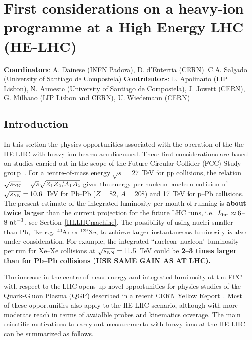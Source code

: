 \documentclass[../report.tex]{subfiles}
\begin{document}
\section{First considerations on a heavy-ion programme at a High Energy LHC (HE-LHC)}
\label{sec:HELHC}

\textbf{Coordinators}: A. Dainese (INFN Padova), D. d'Enterria (CERN), C.A. Salgado (University of Santiago de Compostela)
\linebreak
\textbf{Contributors}: L. Apolinario (LIP Lisbon), N. Armesto (University of Santiago de Compostela), J. Jowett (CERN), G. Milhano (LIP Lisbon and CERN), U. Wiedemann (CERN)

\subsection{Introduction}
\label{sec:HELHC_intro}

In this section the physics opportunities associated with the operation of the the HE-LHC with heavy-ion beams are discussed.
These first considerations are based on studies carried out in the scope of the Future Circular Collider (FCC) Study group~\cite{Dainese:2016gch,FCC-CDR}.
For a centre-of-mass energy $\sqrt{s}= 27$~TeV for pp collisions, the relation $\sqrt{s_{\rm NN}}= \sqrt {s} \sqrt{Z_1 Z_2 / A_1 A_2}$ 
gives the energy per nucleon--nucleon collision of $\sqrt{s_{\rm NN}} = 10.6$~TeV for Pb--Pb ($Z=82$, $A=208$) and 17~TeV for p--Pb collisions. 
The present estimate of the integrated luminosity per month of running is {\bf about twice larger} than  the current projection for the future 
LHC runs, i.e.\, $L_{\rm int}\approx 6$--$8~{\rm nb}^{-1}$, see Section~\ref{HLLHCmachine}. 
The possibility of using nuclei smaller than Pb, like e.g. $^{40}$Ar or $^{129}$Xe, to achieve larger instantaneous luminosity is also under consideration. 
For example, the integrated ``nucleon--nucleon'' luminosity per run 
for Xe--Xe collisions at $\sqrt{s_{\rm NN}}= 11.5$~TeV could be {\bf 2--3 times larger than for Pb--Pb collisions (USE SAME GAIN AS AT LHC).}

The increase in the centre-of-mass energy and integrated luminosity at the FCC with respect to the LHC opens up novel opportunities for physics studies of the Quark-Gluon Plasma (QGP) described in a recent CERN Yellow Report~\cite{Dainese:2016gch}. Most of these opportunities also apply to the HE-LHC scenario, although 
with more moderate reach in terms of avaialble probes and kinematics coverage.
The main scientific motivations to carry out measurements with heavy ions at the HE-LHC can be summarized as follows.
\end{document}
